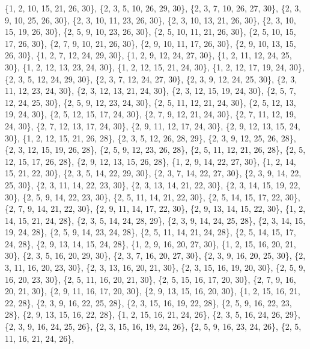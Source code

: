 \documentclass[11pt,a4paper]{article}
\begin{document}
{\{1, 2, 10, 15, 21, 26, 30\}, \{2, 3, 5, 10, 26, 29, 30\}, \{2, 3, 7, 10, 26, 27, 30\}, \{2, 3, 9, 10, 25, 26, 30\}, \{2, 3, 10, 11, 23, 26, 30\},
\{2, 3, 10, 13, 21, 26, 30\}, \{2, 3, 10, 15, 19, 26, 30\}, \{2, 5, 9, 10, 23, 26, 30\}, \{2, 5, 10, 11, 21, 26, 30\}, \{2, 5, 10, 15, 17, 26, 30\},
\{2, 7, 9, 10, 21, 26, 30\}, \{2, 9, 10, 11, 17, 26, 30\}, \{2, 9, 10, 13, 15, 26, 30\}, \{1, 2, 7, 12, 24, 29, 30\}, \{1, 2, 9, 12, 24, 27, 30\},
\{1, 2, 11, 12, 24, 25, 30\}, \{1, 2, 12, 13, 23, 24, 30\}, \{1, 2, 12, 15, 21, 24, 30\}, \{1, 2, 12, 17, 19, 24, 30\}, \{2, 3, 5, 12, 24, 29, 30\},
\{2, 3, 7, 12, 24, 27, 30\}, \{2, 3, 9, 12, 24, 25, 30\}, \{2, 3, 11, 12, 23, 24, 30\}, \{2, 3, 12, 13, 21, 24, 30\}, \{2, 3, 12, 15, 19, 24, 30\},
\{2, 5, 7, 12, 24, 25, 30\}, \{2, 5, 9, 12, 23, 24, 30\}, \{2, 5, 11, 12, 21, 24, 30\}, \{2, 5, 12, 13, 19, 24, 30\}, \{2, 5, 12, 15, 17, 24, 30\},
\{2, 7, 9, 12, 21, 24, 30\}, \{2, 7, 11, 12, 19, 24, 30\}, \{2, 7, 12, 13, 17, 24, 30\}, \{2, 9, 11, 12, 17, 24, 30\}, \{2, 9, 12, 13, 15, 24, 30\},
\{1, 2, 12, 15, 21, 26, 28\}, \{2, 3, 5, 12, 26, 28, 29\}, \{2, 3, 9, 12, 25, 26, 28\}, \{2, 3, 12, 15, 19, 26, 28\}, \{2, 5, 9, 12, 23, 26, 28\},
\{2, 5, 11, 12, 21, 26, 28\}, \{2, 5, 12, 15, 17, 26, 28\}, \{2, 9, 12, 13, 15, 26, 28\}, \{1, 2, 9, 14, 22, 27, 30\}, \{1, 2, 14, 15, 21, 22, 30\},
\{2, 3, 5, 14, 22, 29, 30\}, \{2, 3, 7, 14, 22, 27, 30\}, \{2, 3, 9, 14, 22, 25, 30\}, \{2, 3, 11, 14, 22, 23, 30\}, \{2, 3, 13, 14, 21, 22, 30\},
\{2, 3, 14, 15, 19, 22, 30\}, \{2, 5, 9, 14, 22, 23, 30\}, \{2, 5, 11, 14, 21, 22, 30\}, \{2, 5, 14, 15, 17, 22, 30\}, \{2, 7, 9, 14, 21, 22, 30\},
\{2, 9, 11, 14, 17, 22, 30\}, \{2, 9, 13, 14, 15, 22, 30\}, \{1, 2, 14, 15, 21, 24, 28\}, \{2, 3, 5, 14, 24, 28, 29\}, \{2, 3, 9, 14, 24, 25, 28\},
\{2, 3, 14, 15, 19, 24, 28\}, \{2, 5, 9, 14, 23, 24, 28\}, \{2, 5, 11, 14, 21, 24, 28\}, \{2, 5, 14, 15, 17, 24, 28\}, \{2, 9, 13, 14, 15, 24, 28\},
\{1, 2, 9, 16, 20, 27, 30\}, \{1, 2, 15, 16, 20, 21, 30\}, \{2, 3, 5, 16, 20, 29, 30\}, \{2, 3, 7, 16, 20, 27, 30\}, \{2, 3, 9, 16, 20, 25, 30\},
\{2, 3, 11, 16, 20, 23, 30\}, \{2, 3, 13, 16, 20, 21, 30\}, \{2, 3, 15, 16, 19, 20, 30\}, \{2, 5, 9, 16, 20, 23, 30\}, \{2, 5, 11, 16, 20, 21, 30\},
\{2, 5, 15, 16, 17, 20, 30\}, \{2, 7, 9, 16, 20, 21, 30\}, \{2, 9, 11, 16, 17, 20, 30\}, \{2, 9, 13, 15, 16, 20, 30\}, \{1, 2, 15, 16, 21, 22, 28\},
\{2, 3, 9, 16, 22, 25, 28\}, \{2, 3, 15, 16, 19, 22, 28\}, \{2, 5, 9, 16, 22, 23, 28\}, \{2, 9, 13, 15, 16, 22, 28\}, \{1, 2, 15, 16, 21, 24, 26\},
\{2, 3, 5, 16, 24, 26, 29\}, \{2, 3, 9, 16, 24, 25, 26\}, \{2, 3, 15, 16, 19, 24, 26\}, \{2, 5, 9, 16, 23, 24, 26\}, \{2, 5, 11, 16, 21, 24, 26\},
}
\end{document}
